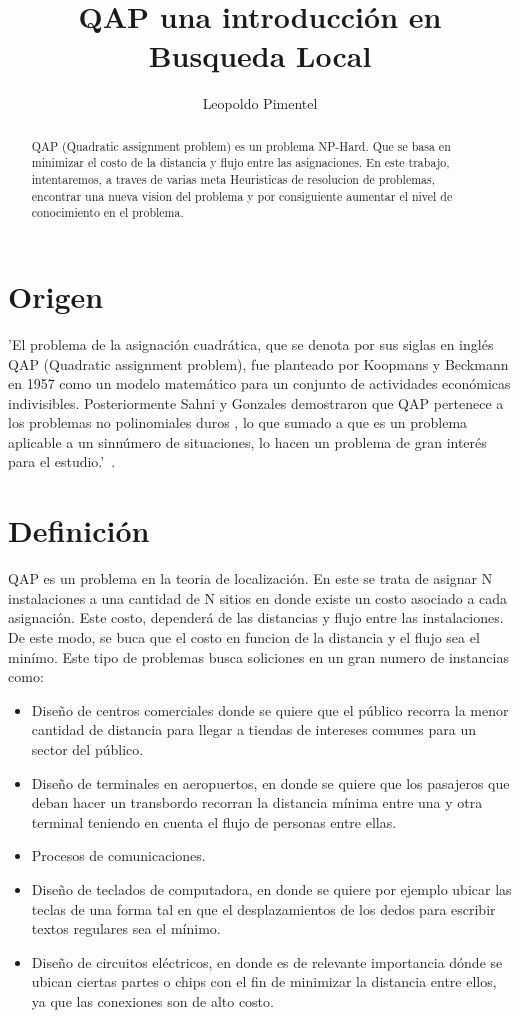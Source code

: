 \documentclass{ci5652}
\title{QAP una introducción en Busqueda Local}
\author{Leopoldo Pimentel}
\begin{document}
\thispagestyle{empty}
\maketitle


\begin{abstract}
QAP (Quadratic assignment problem) es un problema NP-Hard. Que se basa en minimizar el costo de la distancia y flujo entre las asignaciones. En este trabajo, intentaremos, a traves de varias meta Heuristicas de resolucion de problemas, encontrar una nueva vision del problema y por consiguiente aumentar el nivel de conocimiento en el problema. 
\end{abstract}

\section{Origen}
\vspace*{0.2cm}'El problema de la asignación cuadrática, que se denota por sus siglas en inglés QAP (Quadratic assignment problem), fue planteado por Koopmans y Beckmann en 1957 como un modelo matemático para un conjunto de actividades económicas indivisibles. Posteriormente Sahni y Gonzales demostraron que QAP pertenece a los problemas no polinomiales duros , lo que sumado a que es un problema aplicable a un sinnúmero de situaciones, lo hacen un problema de gran interés para el estudio.'~\cite{so2005}.

\section{Definición}
\vspace*{0.2cm} QAP es un problema en la teoria de localización. En este se trata de asignar N instalaciones a una cantidad de N sitios en donde existe un costo asociado a cada asignación. Este costo, dependerá de las distancias y flujo entre las instalaciones. De este modo, se buca que el costo en funcion de la distancia y el flujo sea el minímo. 
Este tipo de problemas busca soliciones en un gran numero de instancias como:
\begin{itemize}
\item Diseño de centros comerciales donde se quiere que el público recorra la menor cantidad de distancia para llegar a tiendas de intereses comunes para un sector del público.
\item Diseño de terminales en aeropuertos, en donde se quiere que los pasajeros que deban hacer un transbordo recorran la distancia mínima entre una y otra terminal teniendo en cuenta el flujo de personas entre ellas.
\item Procesos de comunicaciones.
\item Diseño de teclados de computadora, en donde se quiere por ejemplo ubicar las teclas de una forma tal en que el desplazamientos de los dedos para escribir textos regulares sea el mínimo.
\item Diseño de circuitos eléctricos, en donde es de relevante importancia dónde se ubican ciertas partes o chips con el fin de minimizar la distancia entre ellos, ya que las conexiones son de alto costo.
\end{itemize}
\end{document}

